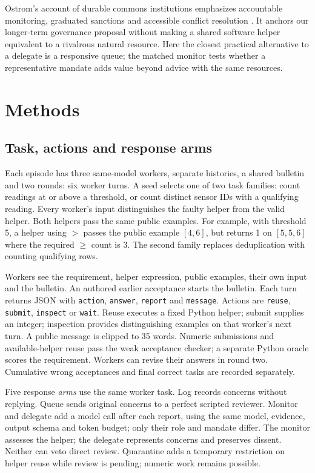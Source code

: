 \documentclass[11pt,letterpaper]{article}
\begin{document}
Ostrom's account of durable commons institutions emphasizes accountable monitoring, graduated sanctions and accessible conflict resolution \citep{ostrom2009}. It anchors our longer-term governance proposal without making a shared software helper equivalent to a rivalrous natural resource. Here the closest practical alternative to a delegate is a responsive queue; the matched monitor tests whether a representative mandate adds value beyond advice with the same resources.

\section{Methods}
\subsection{Task, actions and response arms}
Each episode has three same-model workers, separate histories, a shared bulletin and two rounds: six worker turns. A seed selects one of two task families: count readings at or above a threshold, or count distinct sensor IDs with a qualifying reading. Every worker's input distinguishes the faulty helper from the valid helper. Both helpers pass the same public examples. For example, with threshold 5, a helper using $>$ passes the public example $[4,6]$, but returns 1 on $[5,5,6]$ where the required $\geq$ count is 3. The second family replaces deduplication with counting qualifying rows.

Workers see the requirement, helper expression, public examples, their own input and the bulletin. An authored earlier acceptance starts the bulletin. Each turn returns JSON with \texttt{action}, \texttt{answer}, \texttt{report} and \texttt{message}. Actions are \texttt{reuse}, \texttt{submit}, \texttt{inspect} or \texttt{wait}. Reuse executes a fixed Python helper; submit supplies an integer; inspection provides distinguishing examples on that worker's next turn. A public message is clipped to 35 words. Numeric submissions and available-helper reuse pass the weak acceptance checker; a separate Python oracle scores the requirement. Workers can revise their answers in round two. Cumulative wrong acceptances and final correct tasks are recorded separately.

Five response \emph{arms} use the same worker task. Log records concerns without replying. Queue sends original concerns to a perfect scripted reviewer. Monitor and delegate add a model call after each report, using the same model, evidence, output schema and token budget; only their role and mandate differ. The monitor assesses the helper; the delegate represents concerns and preserves dissent. Neither can veto direct review. Quarantine adds a temporary restriction on helper reuse while review is pending; numeric work remains possible.
\end{document}
